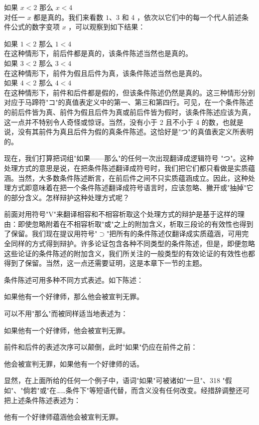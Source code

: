 如果 $x<2$ 那么 $x<4$\\
对任一 $x$ 都是真的。我们来看数 $1 、 3$ 和 4 ，依次以它们中的每一个代人前述条件公式的数字变项 $x$ ，可以观察到如下结果：

如果 $1<2$ 那么 $1<4$\\
在这种情形下，前后件都是真的，该条件陈述当然也是真的。\\
如果 $3<2$ 那么 $3<4$\\
在这种情形下，前件为假且后件为真，该条件陈述当然也是真的。\\
如果 $4<2$ 那么 $4<4$\\
在这种情形下，前件和后件都是假的，但该条件陈述仍然是真的。这三种情形分别对应于马蹄符"コ"的真值表定义中的第一、第三和第四行。可见，在一个条件陈述的前后件皆为真、前件为假且后件为真或前后件皆为假时，该条件陈述应该为真，这一点并不特别令人奇怪或惊讶。当然，没有小于 2 且不小于 4 的数，也就是说，没有其前件为真且后件为假的真条件陈述。这恰好是"つ"的真值表定义所表明的。

现在，我们打算把词组"如果——那么"的任何一次出现翻译成逻辑符号 "つ"。这种处理方式的意思是说，在把条件陈述翻译成符号时，我们把它们都只看做是实质蕴涵。当然，大多数条件陈述断言，在前后件之间不只实质蕴涵成立。因此，这种处理方式即意味着在把一个条件陈述翻译成符号语言时，应该忽略、撇开或"抽掉"它的部分含义。怎样辩护这种处理方式呢？

前面对用符号"V"来翻译相容和不相容析取这个处理方式的辩护是基于这样的理由：即使忽略附着在不相容析取"或"之上的附加含义，析取三段论的有效性也得到了保留。我们现在提议用符号"$\supset$"把所有的条件陈述仅翻译成实质蕴涵，可用完全同样的方式得到辩护。许多论证包含各种不同类型的条件陈述，但是，即便忽略这些论证的条件陈述的附加含义，我们所关注的一般类型的有效论证的有效性也都得到了保留。当然，这一点还需要证明，这是本章下一节的主题。

条件陈述可用多种不同方式表述。如下陈述：

如果他有一个好律师，那么他会被宣判无罪。

可以不用"那么"而被同样适当地表述为：

如果他有一个好律师，他会被宣判无罪。

前件和后件的表述次序可以颠倒，此时"如果"仍应在前件之前：

他会被宣判无罪，如果他有一个好律师的话。

显然，在上面所给的任何一个例子中，语词"如果"可被诸如"一旦"、318 "假如"、"倘若"或"在……条件下"等短语代替，而含义没有任何改变。经措辞调整还可把上述条件陈述表述为：

他有一个好律师蕴涵他会被宣判无罪。

